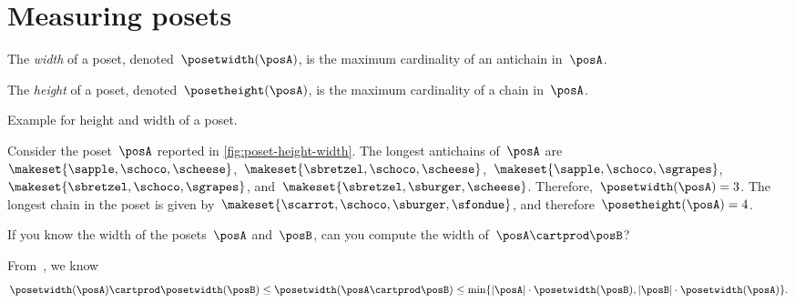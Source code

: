 
\section{Measuring posets}
\begin{definition}
    \label{def:poset-width}
    The \emph{width} of a poset, denoted~$\posetwidth(\posA)$, is the maximum cardinality of an antichain in~$\posA$.
\end{definition}

\begin{definition}
    \label{def:poset-height}
    The \emph{height} of a poset, denoted~$\posetheight(\posA)$, is the maximum cardinality of a chain in~$\posA$.
\end{definition}

\begin{marginfigure}
    \centering
    \caption{Example for height and width of a poset.}
    \label{fig:poset-height-width}
\end{marginfigure}

\begin{example}
    Consider the poset~$\posA$ reported in \cref{fig:poset-height-width}.
    The longest antichains of~$\posA$ are~$\makeset{\sapple, \schoco, \scheese}$,~$\makeset{\sbretzel, \schoco, \scheese}$,~$\makeset{\sapple, \schoco, \sgrapes}$,~$\makeset{\sbretzel, \schoco, \sgrapes}$, and~$\makeset{\sbretzel, \sburger, \scheese}$.
    Therefore,~$\posetwidth(\posA)=3$.
    The longest chain in the poset is given by~$\makeset{\scarrot,\schoco,\sburger,\sfondue}$, and therefore~$\posetheight(\posA)=4$.
\end{example}

\begin{exercise}
    \label{ex:width}
    If you know the width of the posets~$\posA$ and~$\posB$, can you compute the width of~$\posA\cartprod\posB$?
\end{exercise}
\begin{solution}
    From~\cite{bezrukovantichains}, we know
    \begin{equation*}
        \posetwidth(\posA)\cartprod \posetwidth(\posB)\leq \posetwidth(\posA\cartprod \posB)\leq \min \{ \vert \posA\vert \cdot \posetwidth(\posB),\vert \posB \vert \cdot \posetwidth(\posA)\}.
    \end{equation*}
\end{solution}


